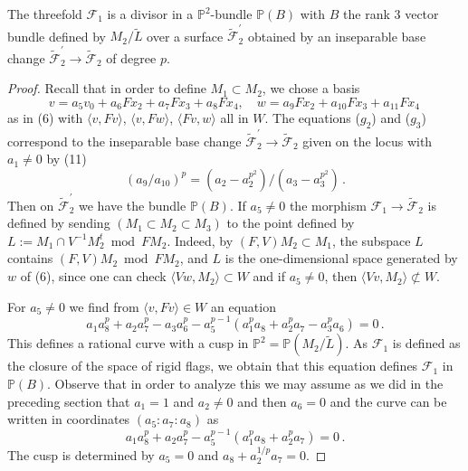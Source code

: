 \documentclass[10pt,a4paper]{amsart}
\newcommand{\PP}{\mathbb P}
\begin{document}
\begin{lemma}
The threefold $\mathcal{F}_1$ is a divisor in a ${\PP}^2$-bundle ${\PP}(B)$
with $B$ the rank $3$ vector bundle defined by $M_2/\tilde{L}$
over a surface $\tilde{\mathcal{F}}_2^{\prime}$ obtained by an inseparable base change 
$\tilde{\mathcal{F}}_2^{\prime} \to\tilde{\mathcal{F}}_2$
of degree $p$.
\end{lemma}

\begin{proof}
Recall that in order to define $M_1 \subset M_2$, we chose a basis 
$$
v=a_5v_0+a_6Fx_2+a_7Fx_3+a_8Fx_4, \quad
w=a_9Fx_2+a_{10}Fx_3+a_{11}Fx_4 \, 
$$
as in (6) with $\langle v,Fv\rangle$, $\langle v,Fw\rangle$, $\langle Fv,w\rangle$
all in $W$. 
The equations ($g_2$) and ($g_3$) correspond to the inseparable 
base change $\tilde{\mathcal{F}}_2^{\prime} \to\tilde{\mathcal{F}}_2$
given on the locus with $a_1\neq 0$ by (11) 
$$
(a_9/a_{10})^p= (a_2-a_2^{p^2})/(a_3-a_3^{p^2})\, .
$$
Then on $\tilde{\mathcal{F}}_2^{\prime}$ we have the bundle ${\PP}(B)$.
If $a_5\neq 0$ the morphism
${\mathcal F}_1 \to \tilde{\mathcal F}_2$ is defined by sending
$(M_1 \subset M_2 \subset M_3)$ to the point defined by $L:=M_1 \cap V^{-1}M_2^t \bmod FM_2$.
Indeed,
by $(F,V)M_2 \subset M_1$, the subspace $L$ contains $(F,V)M_2 \bmod FM_2$,
and $L$ is the one-dimensional space generated by $w$ of (6),
since one can check $\langle Vw, M_2 \rangle\subset W$ and if $a_5 \ne0$, 
then $\langle Vv, M_2 \rangle \not\subset W$.

For $a_5\neq 0$ we find from $\langle v, Fv\rangle \in W$ an equation 
$$
a_1a_8^p+a_2a_7^p-a_3a_6^p -a_5^{p-1}(a_1^pa_8+a_2^pa_7-a_3^pa_6)=0\, .
$$
This defines a rational curve with a cusp in ${\PP}^2={\PP}(M_2/\tilde{L})$.
As $\mathcal{F}_1$ is defined as the closure of the space of rigid flags,
we obtain that this equation defines $\mathcal{F}_1$ in ${\PP}(B)$.
Observe that in order to analyze this we may assume as we did in the 
preceding section that
$a_1=1$ and $a_2\neq 0$ and then $a_6=0$ and the curve can be written 
in coordinates $(a_5:a_7:a_8)$ as
$$
a_1a_8^p+a_2a_7^p -a_5^{p-1}(a_1^pa_8+a_2^pa_7)=0\, .
$$
The cusp is determined by $a_5=0$ and $a_8+a_2^{1/p}a_7=0$. 
\end{proof}
\end{document}
